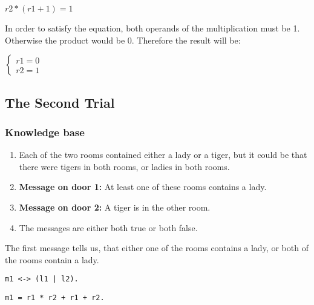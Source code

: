 \begin{center}
\begin{math}
 r2 * (r1 + 1) = 1
\end{math} 
\end{center}

In order to satisfy the equation, both operands of the multiplication must be 1. Otherwise the product would be 0. Therefore the result will be:

\begin{center}
\begin{math}
\begin{cases}
 r1 = 0\\
 r2 = 1
\end{cases}
\end{math} 
\end{center}








\subsection{The Second Trial}

\subsubsection{Knowledge base}

\begin{enumerate}

\item Each of the two rooms contained either a lady or a tiger, but it could be that there were tigers in both rooms, or ladies in both rooms.

\item \textbf{Message on door 1:} At least one of these rooms contains a lady.

\item \textbf{Message on door 2:} A tiger is in the other room.

\item The messages are either both true or both false.

\end{enumerate}


The first message tells us, that either one of the rooms contains a lady, or both of the rooms contain a lady.


\begin{multicols}{2}

\begin{lstlisting}[numbers=none,title=Propositional logic]
m1 <-> (l1 | l2).
\end{lstlisting}

\begin{lstlisting}[numbers=none,title=Modular arithmetics]
m1 = r1 * r2 + r1 + r2.
\end{lstlisting}

\end{multicols}


